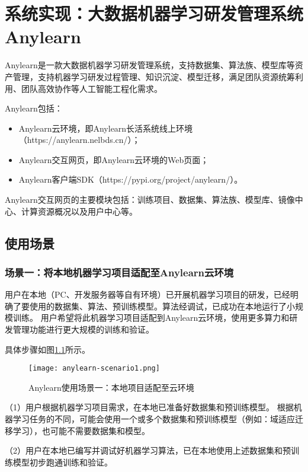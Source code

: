 
\chapter{系统实现：大数据机器学习研发管理系统Anylearn}

Anylearn是一款大数据机器学习研发管理系统，支持数据集、算法族、模型库等资产管理，支持机器学习研发过程管理、知识沉淀、模型迁移，满足团队资源统筹利用、团队高效协作等人工智能工程化需求。

Anylearn包括：
\begin{itemize}
  \item Anylearn云环境，即Anylearn长活系统线上环境（https://anylearn.nelbds.cn/）；
  \item Anylearn交互网页，即Anylearn云环境的Web页面；
  \item Anylearn客户端SDK（https://pypi.org/project/anylearn/）。
\end{itemize}

Anylearn交互网页的主要模块包括：训练项目、数据集、算法族、模型库、镜像中心、计算资源概况以及用户中心等。


\section{使用场景}

\subsection{场景一：将本地机器学习项目适配至Anylearn云环境}

用户在本地（PC、开发服务器等自有环境）已开展机器学习项目的研发，已经明确了要使用的数据集、算法、预训练模型。算法经调试，已成功在本地运行了小规模训练。
用户希望将此机器学习项目适配到Anylearn云环境，使用更多算力和研发管理功能进行更大规模的训练和验证。

具体步骤如图\ref{fig:scenario1}所示。

\begin{figure}
  \centering
  \texttt{[image: anylearn-scenario1.png]}
  \caption{Anylearn使用场景一：本地项目适配至云环境}
  \label{fig:scenario1}
\end{figure}

（1）用户根据机器学习项目需求，在本地已准备好数据集和预训练模型。
根据机器学习任务的不同，可能会使用一个或多个数据集和预训练模型（例如：域适应迁移学习），也可能不需要数据集和模型。

（2）用户在本地已编写并调试好机器学习算法，已在本地使用上述数据集和预训练模型初步跑通训练和验证。

